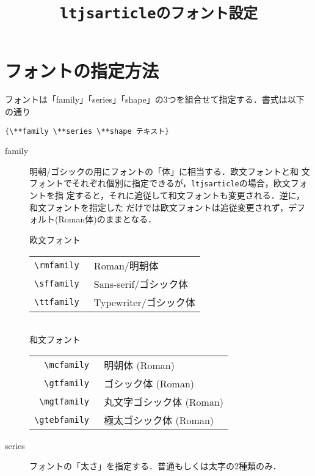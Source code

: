 \documentclass[12pt,a4paper]{ltjsarticle}
\title{\tt{ltjsarticle}のフォント設定}
\begin{document}
\maketitle
\section{フォントの指定方法}
\label{sec:font}
フォントは「family」「series」「shape」の3つを組合せて指定する．書式は以下の通り
\begin{lstlisting}[frame=single]
  {\**family \**series \**shape テキスト}
\end{lstlisting}
\begin{description}
\item[family] 明朝/ゴシックの用にフォントの「体」に相当する．欧文フォントと和
  文フォントでそれぞれ個別に指定できるが，{\tt ltjsarticle}の場合，欧文フォントを指
  定すると，それに追従して和文フォントも変更される．逆に，和文フォントを指定した
  だけでは欧文フォントは追従変更されず，デフォルト(Roman体)のままとなる．
  \begin{table}[h]
    \centering
      欧文フォント\\
    \begin{tabular}{rl}
      \hline
      \tt{\textbackslash{}rmfamily} & {\rmfamily Roman/明朝体}\\
      \tt{\textbackslash{}sffamily} & {\sffamily Sans-serif/ゴシック体}\\
      \tt{\textbackslash{}ttfamily} & {\ttfamily Typewriter/ゴシック体}\\
      \hline
    \end{tabular}\\
      和文フォント\\
    \begin{tabular}{rl}
      \hline
      \tt{\textbackslash{}mcfamily} & {\mcfamily 明朝体 (Roman)}\\
      \tt{\textbackslash{}gtfamily} & {\gtfamily ゴシック体 (Roman)}\\
      \tt{\textbackslash{}mgtfamily} & {\mgfamily 丸文字ゴシック体 (Roman)}\\
      \tt{\textbackslash{}gtebfamily} & {\gtebfamily 極太ゴシック体 (Roman)}\\
      \hline
    \end{tabular}
  \end{table}
\item[series] フォントの「太さ」を指定する．普通もしくは太字の2種類のみ．
  \begin{table}[h]
    \centering

\end{table}
\end{description}
\end{document}
